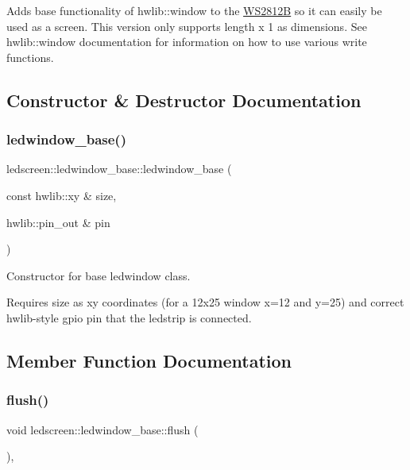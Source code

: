 Adds base functionality of hwlib\+::window to the \hyperlink{classledscreen_1_1WS2812B}{W\+S2812B} so it can easily be used as a screen. This version only supports length x 1 as dimensions. See hwlib\+::window documentation for information on how to use various write functions. 

\subsection{Constructor \& Destructor Documentation}
\mbox{\label{classledscreen_1_1ledwindow__base_aabe3e38cf9ec10d481d6e4eba5fa6c86}} 
\subsubsection{\texorpdfstring{ledwindow\+\_\+base()}{ledwindow\_base()}}
{\footnotesize\ttfamily ledscreen\+::ledwindow\+\_\+base\+::ledwindow\+\_\+base (\begin{DoxyParamCaption}\item[{const hwlib\+::xy \&}]{size,  }\item[{hwlib\+::pin\+\_\+out \&}]{pin }\end{DoxyParamCaption})\hspace{0.3cm}{\ttfamily [inline]}}



Constructor for base ledwindow class. 

Requires size as xy coordinates (for a 12x25 window x=12 and y=25) and correct hwlib-\/style gpio pin that the ledstrip is connected. 

\subsection{Member Function Documentation}
\mbox{\label{classledscreen_1_1ledwindow__base_ab64f6d49e338937277579e3b4d74c363}} 
\subsubsection{\texorpdfstring{flush()}{flush()}}
{\footnotesize\ttfamily void ledscreen\+::ledwindow\+\_\+base\+::flush (\begin{DoxyParamCaption}{ }\end{DoxyParamCaption})\hspace{0.3cm}{\ttfamily [inline]}, {\ttfamily [override]}}



